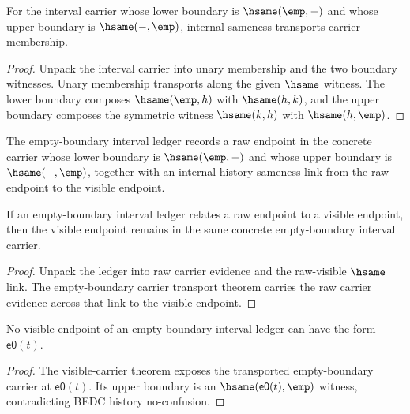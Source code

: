 \begin{theorem}
\label{thm:interval-empty-boundary-hsame-transport}
For the interval carrier whose lower boundary is \(\hsame(\emp,-)\) and whose upper boundary is \(\hsame(-,\emp)\), internal sameness transports carrier membership.
\end{theorem}
\begin{proof}
Unpack the interval carrier into unary membership and the two boundary witnesses. Unary membership transports along the given \(\hsame\) witness. The lower boundary composes \(\hsame(\emp,h)\) with \(\hsame(h,k)\), and the upper boundary composes the symmetric witness \(\hsame(k,h)\) with \(\hsame(h,\emp)\).
\end{proof}

\begin{definition}
\label{def:interval-empty-boundary-ledger-policy}
The empty-boundary interval ledger records a raw endpoint in the concrete
carrier whose lower boundary is \(\hsame(\emp,-)\) and whose upper boundary is
\(\hsame(-,\emp)\), together with an internal history-sameness link from the
raw endpoint to the visible endpoint.
\end{definition}

\begin{theorem}
\label{thm:interval-empty-boundary-ledger-visible-carrier}
If an empty-boundary interval ledger relates a raw endpoint to a visible
endpoint, then the visible endpoint remains in the same concrete
empty-boundary interval carrier.
\end{theorem}
\begin{proof}
Unpack the ledger into raw carrier evidence and the raw-visible
\(\hsame\) link. The empty-boundary carrier transport theorem carries the raw
carrier evidence across that link to the visible endpoint.
\end{proof}

\begin{theorem}
\label{thm:interval-empty-boundary-ledger-visible-no-e0}
No visible endpoint of an empty-boundary interval ledger can have the form
$\mathsf{e0}(t)$.
\end{theorem}
\begin{proof}
The visible-carrier theorem exposes the transported empty-boundary carrier at
$\mathsf{e0}(t)$. Its upper boundary is an $\hsame(\mathsf{e0}(t),\emp)$
witness, contradicting BEDC history no-confusion.
\end{proof}

